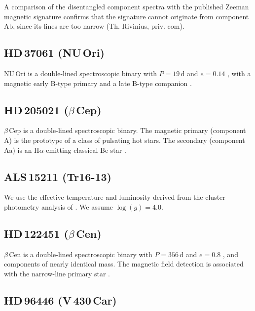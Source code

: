 \documentclass[useAMS,usenatbib]{mn2e}
\begin{document}
A comparison of the disentangled component spectra with the published Zeeman magnetic signature confirms that the signature cannot originate from component Ab, since its lines are too narrow (Th. Rivinius, priv. com).

\setcounter{subsection}{11}
\subsection{HD\,37061 (NU\,Ori)}

NU\,Ori is a double-lined spectroscopic binary with $P=19$\,d and $e=0.14$ \citep{1991ApJ...367..155A}, with a magnetic early B-type primary and a late B-type companion \citep{2008MNRAS.387L..23P}.

\setcounter{subsection}{17}
\subsection{HD\,205021 ($\beta$\,Cep)}

$\beta$\,Cep is a double-lined spectroscopic binary. The magnetic primary (component A) is the prototype of a class of pulsating hot stars. The secondary (component Aa) is an H$\alpha$-emitting classical Be star \citep{2008MNRAS.387..759C}.

\setcounter{subsection}{18}
\subsection{ALS\,15211 (Tr16-13)}

We use the effective temperature and luminosity derived from the cluster photometry analysis of \citet{2011ApJS..194....5G}. We assume $\log(g)=4.0$. 	

\setcounter{subsection}{19}
\subsection{HD\,122451 ($\beta$\,Cen)}

$\beta$\,Cen is a double-lined spectroscopic binary with $P=356$\,d and $e=0.8$ \citep{2006A&A...455..259A}, and components of nearly identical mass. The magnetic field detection is associated with the narrow-line primary star \citep{2011A&A...536L...6A}. 

\setcounter{subsection}{23}
\subsection{HD\,96446 (V\,430\,Car)}
\end{document}
